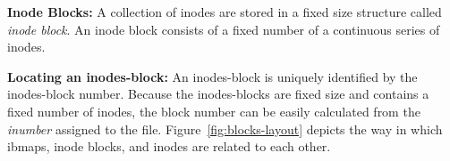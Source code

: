 \documentclass[]{article}
\newcommand{\subtopic}[1]{\vspace{1.5pt} \noindent \textbf{#1}}
\newcommand{\hl}[1]{\textcolor{hlcolor}{#1}}
\begin{document}
%
%
%
%
%

\subtopic{Inode Blocks:} A collection of inodes are stored in a fixed size
structure called \textit{inode block}. An inode block consists of a fixed
number of a continuous series of inodes. 


\subtopic{Locating an inodes-block:} An inodes-block is uniquely identified by
the inodes-block number.  Because the inodes-blocks are fixed size and contains a
fixed number of inodes, the block number can be easily calculated from the
\textit{inumber} assigned to the file.
Figure~\ref{fig:blocks-layout} depicts the way in which ibmaps, inode blocks, and
inodes are related to each other.
\end{document}
